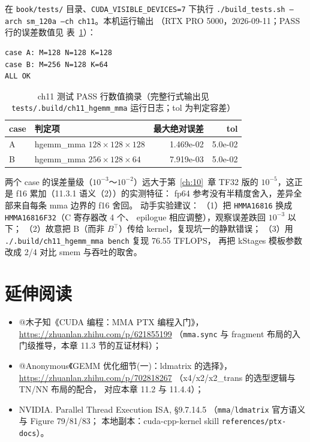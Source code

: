 在 \texttt{book/tests/} 目录、\texttt{CUDA\_\allowbreak{}VISIBLE\_\allowbreak{}DEVICES=\allowbreak{}7} 下执行
\texttt{.\allowbreak{}/\allowbreak{}build\_\allowbreak{}tests.\allowbreak{}sh --arch sm\_\allowbreak{}120a --ch ch11}。本机运行输出
（RTX PRO 5000，2026-09-11；PASS 行的误差数值见
表~\ref{tab:11-pass}）：

\begin{lstlisting}[style=console]
case A: M=128 N=128 K=128
case B: M=256 N=128 K=64
ALL OK
\end{lstlisting}

\begin{table}[htbp]
\centering
\caption{ch11 测试 PASS 行数值摘录（完整行式输出见
\texttt{tests/\allowbreak{}.\allowbreak{}build/\allowbreak{}ch11\_\allowbreak{}hgemm\_\allowbreak{}mma} 运行日志；tol 为判定容差）}
\label{tab:11-pass}
\begin{tabular}{llrr}
\toprule
case & 判定项 & 最大绝对误差 & tol \\
\midrule
A & hgemm\_mma $128\times128\times128$ & 1.469e-02 & 5.0e-02 \\
B & hgemm\_mma $256\times128\times64$  & 7.919e-03 & 5.0e-02 \\
\bottomrule
\end{tabular}
\end{table}

两个 case 的误差量级（$10^{-3}$～$10^{-2}$）远大于第~\ref{ch:10}~章 TF32 版的
$10^{-5}$，这正是 f16 累加（11.3.1 语义（2））的实测特征：
fp64 参考没有半精度舍入，差异全部来自每条 mma 边界的 f16 舍回。
动手实验建议：
（1）把 \texttt{HMMA16816} 换成 \texttt{HMMA16816\allowbreak{}F32}（C 寄存器改 4 个、
epilogue 相应调整），观察误差跌回 $10^{-3}$ 以下；
（2）故意把 B（而非 $B^{\top}$）传给 kernel，复现坑一的静默错误；
（3）用 \texttt{.\allowbreak{}/\allowbreak{}.\allowbreak{}build/\allowbreak{}ch11\_\allowbreak{}hgemm\_\allowbreak{}mma bench} 复现 76.55 TFLOPS，
再把 kStages 模板参数改成 2/4 对比 smem 与吞吐的取舍。

\section*{延伸阅读}

\begin{itemize}
  \item @木子知《CUDA 编程：MMA PTX 编程入门》，
        \url{https://zhuanlan.zhihu.com/p/621855199}
        （\texttt{mma.sync} 与 fragment 布局的入门级推导，本章
        11.3 节的互证材料）；
  \item @Anonymous《GEMM 优化细节(一)：ldmatrix 的选择》，
        \url{https://zhuanlan.zhihu.com/p/702818267}
        （x4/x2/x2\_trans 的选型逻辑与 TN/NN 布局的配合，
        对应本章 11.2 与 11.4.4）；
  \item NVIDIA. Parallel Thread Execution ISA, §9.7.14.5
        （\texttt{mma}/\texttt{ldmatrix} 官方语义与 Figure 79/81/83；
        本地副本：cuda-cpp-kernel skill \texttt{references/\allowbreak{}ptx-docs}）。
\end{itemize}
